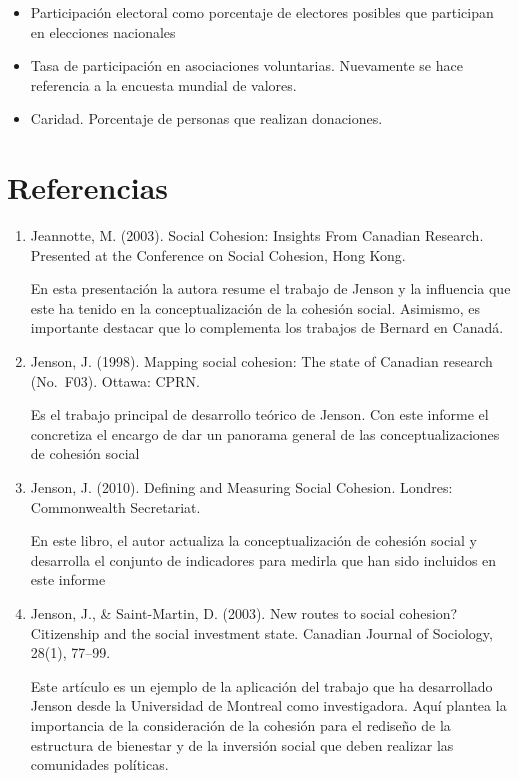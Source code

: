 \documentclass[
  12pt,
]{book}
\providecommand{\tightlist}{%
  \setlength{\itemsep}{0pt}\setlength{\parskip}{0pt}}
\begin{document}
\begin{itemize}
\tightlist
\item
  Participación electoral como porcentaje de electores posibles que participan en elecciones nacionales
\item
  Tasa de participación en asociaciones voluntarias. Nuevamente se hace referencia a la encuesta mundial de valores.
\item
  Caridad. Porcentaje de personas que realizan donaciones.
\end{itemize}

\hypertarget{referencias}{%
\section{Referencias}\label{referencias}}

\begin{enumerate}
\def\labelenumi{\arabic{enumi}.}
\item
  Jeannotte, M. (2003). Social Cohesion: Insights From Canadian
  Research. Presented at the Conference on Social Cohesion, Hong Kong.

  En esta presentación la autora resume el trabajo de Jenson y la
  influencia que este ha tenido en la conceptualización de la cohesión
  social. Asimismo, es importante destacar que lo complementa los trabajos
  de Bernard en Canadá.
\item
  Jenson, J. (1998). Mapping social cohesion: The state of Canadian
  research (No.~F03). Ottawa: CPRN.

  Es el trabajo principal de desarrollo teórico de Jenson. Con este informe el concretiza el encargo de dar un panorama general de las conceptualizaciones de cohesión social
\item
  Jenson, J. (2010). Defining and Measuring Social Cohesion. Londres:
  Commonwealth Secretariat.

  En este libro, el autor actualiza la conceptualización de cohesión social y desarrolla el conjunto de indicadores para medirla que han sido incluidos en este informe
\item
  Jenson, J., \& Saint-Martin, D. (2003). New routes to social cohesion? Citizenship and the social investment state. Canadian
  Journal of Sociology, 28(1), 77--99.

  Este artículo es un ejemplo de la aplicación del trabajo que ha desarrollado Jenson desde la Universidad de Montreal como investigadora. Aquí plantea la importancia de la consideración de la cohesión para el rediseño de la estructura de bienestar y de la inversión social que deben realizar las comunidades políticas.
\end{enumerate}
\end{document}
